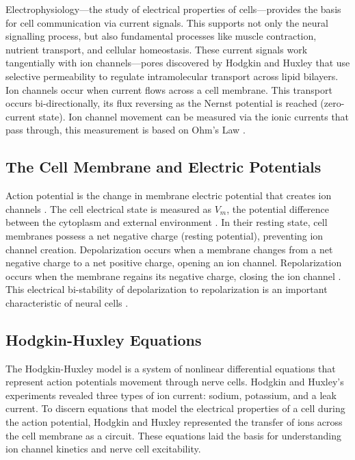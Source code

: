 \documentclass{article} %
\begin{document}
\begin{multicols}{2}
Electrophysiology—the study of electrical properties of cells—provides the basis for cell communication via current signals. 
This supports not only the neural signalling process, but also fundamental processes like muscle contraction, nutrient transport, and cellular homeostasis. 
These current signals work tangentially with ion channels—pores discovered by Hodgkin and Huxley that use selective permeability to regulate intramolecular transport across lipid bilayers. 
Ion channels occur when current flows across a cell membrane. This transport occurs bi-directionally, its flux reversing as the Nernst potential is reached (zero-current state). 
Ion channel movement can be measured via the ionic currents that pass through, this measurement is based on Ohm's Law \citep{rubaiy2017electrophysiology}.

\subsection{The Cell Membrane and Electric Potentials}
\label{subsubsec:resting_potential}

Action potential is the change in membrane electric potential that creates ion channels \cite{rubaiy2017electrophysiology}. 
The cell electrical state is measured as $V_{m}$, the potential difference between the cytoplasm and external environment \cite{cervera2016bioelectrical}. 
In their resting state, cell membranes possess a net negative charge (resting potential), preventing ion channel creation. 
Depolarization occurs when a membrane changes from a net negative charge to a net positive charge, opening an ion channel. 
Repolarization occurs when the membrane regains its negative charge, closing the ion channel \cite{rubaiy2017electrophysiology}. 
This electrical bi-stability of depolarization to repolarization is an important characteristic of neural cells \cite{cervera2016bioelectrical}.

\subsection{Hodgkin-Huxley Equations}
\label{subsec:hodgekin_huxley}

The Hodgkin-Huxley model is a system of nonlinear differential equations that represent action potentials movement through nerve cells. 
Hodgkin and Huxley’s experiments revealed three types of ion current: sodium, potassium, and a leak current. 
To discern equations that model the electrical properties of a cell during the action potential, Hodgkin and Huxley represented the transfer of ions across the cell membrane as a circuit. 
These equations laid the basis for understanding ion channel kinetics and nerve cell excitability.


\end{multicols}
\end{document}
